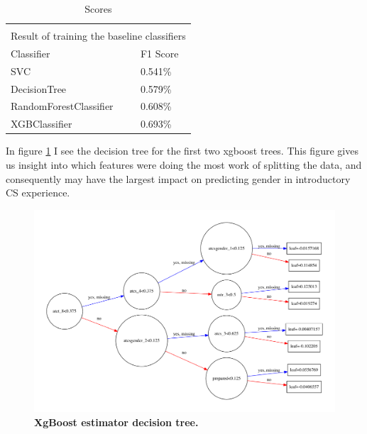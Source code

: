 \setlength{\extrarowheight}{1.5pt}
\begin{table}[!htbp]
\caption{Scores} %
\centering %
\begin{tabular}{|p{6cm}|p{1.5cm}|} %
\hline %


\multicolumn{2}{|c|}{}\\
\multicolumn{2}{|c|}{Result of training the baseline classifiers}\\[5pt]
\hline
Classifier & F1 Score\\[0.5ex]
\hline %

SVC     & 0.541\% \\
DecisionTree       & 0.579\% \\
RandomForestClassifier   & 0.608\% \\
XGBClassifier            & 0.693\% \\

\hline%
\end{tabular}
\label{tableBenchMarkScores}
\end{table}

In figure \ref{plot_tree} I see the decision tree for the first two xgboost trees. This figure gives us insight into which features were doing the most work of splitting the data, and consequently may have the largest impact on predicting gender in introductory CS experience.


\begin{figure}[!hbtp]
\centering
    \includegraphics[width=1\textwidth]{figures/X_graph}
    \caption{\textbf{XgBoost estimator decision tree. }\textit{}}\label{plot_tree}
\end{figure}



